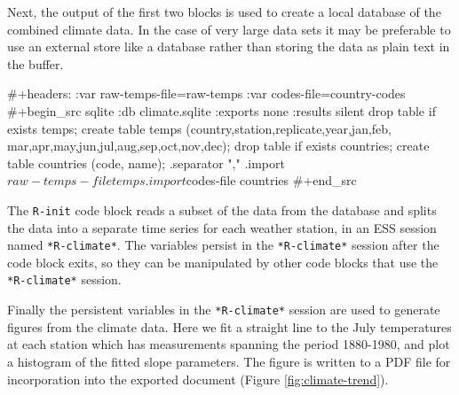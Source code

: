 \documentclass[article,shortnames]{jss}
\begin{document}
Next, the output of the first two blocks is used to create a local
database of the combined climate data.  In the case of very large data
sets it may be preferable to use an external store like a database
rather than storing the data as plain text in the  buffer.


\begin{Code}
#+headers: :var raw-temps-file=raw-temps :var codes-file=country-codes
#+begin_src sqlite :db climate.sqlite :exports none :results silent
  drop table if exists temps;
  create table temps (country,station,replicate,year,jan,feb,
         mar,apr,may,jun,jul,aug,sep,oct,nov,dec);
  drop table if exists countries;
  create table countries (code, name);
  .separator ","
  .import $raw-temps-file temps
  .import $codes-file countries
#+end_src
\end{Code}






The \texttt{R-init} code block reads a subset of the data from the 
database and splits the data into a separate time series for each
weather station, in an ESS  session named \texttt{*R-climate*}. The
variables persist in the \texttt{*R-climate*} session after the code block
exits, so they can be manipulated by other  code blocks that use the
\texttt{*R-climate*} session.








Finally the persistent variables in the \texttt{*R-climate*} session are used
to generate figures from the climate data. Here we fit a straight line
to the July temperatures at each station which has measurements
spanning the period 1880-1980, and plot a histogram of the fitted
slope parameters. The figure is written to a PDF file for
incorporation into the exported document (Figure
\ref{fig:climate-trend}).
\end{document}
